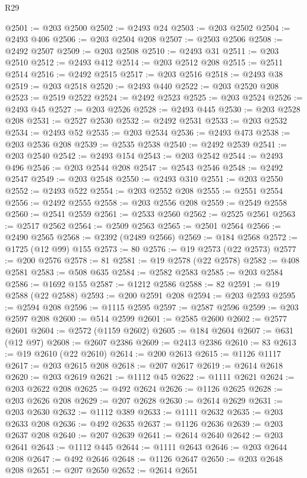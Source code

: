 \begin{lexlean}{R29}
\begin{coremodule}
@2501 := @203 @2500
@2502 := @2493 @24
@2503 := @203 @2502
@2504 := @2493 @406
@2506 := @203 @2504 @208
@2507 := @2503 @2506
@2508 := @2492 @2507
@2509 := @203 @2508
@2510 := @2493 @31
@2511 := @203 @2510
@2512 := @2493 @412
@2514 := @203 @2512 @208
@2515 := @2511 @2514
@2516 := @2492 @2515
@2517 := @203 @2516
@2518 := @2493 @38
@2519 := @203 @2518
@2520 := @2493 @440
@2522 := @203 @2520 @208
@2523 := @2519 @2522
@2524 := @2492 @2523
@2525 := @203 @2524
@2526 := @2493 @45
@2527 := @203 @2526
@2528 := @2493 @445
@2530 := @203 @2528 @208
@2531 := @2527 @2530
@2532 := @2492 @2531
@2533 := @203 @2532
@2534 := @2493 @52
@2535 := @203 @2534
@2536 := @2493 @473
@2538 := @203 @2536 @208
@2539 := @2535 @2538
@2540 := @2492 @2539
@2541 := @203 @2540
@2542 := @2493 @154
@2543 := @203 @2542
@2544 := @2493 @496
@2546 := @203 @2544 @208
@2547 := @2543 @2546
@2548 := @2492 @2547
@2549 := @203 @2548
@2550 := @2493 @310
@2551 := @203 @2550
@2552 := @2493 @522
@2554 := @203 @2552 @208
@2555 := @2551 @2554
@2556 := @2492 @2555
@2558 := @203 @2556 @208
@2559 := @2549 @2558
@2560 := @2541 @2559
@2561 := @2533 @2560
@2562 := @2525 @2561
@2563 := @2517 @2562
@2564 := @2509 @2563
@2565 := @2501 @2564
@2566 := @2490 @2565
@2568 := @2392 (@2489 @2566)
@2569 := @184 @2568
@2572 := @1725 (@12 @99) @155
@2573 := 80
@2576 := @19 @2573 (@22 @2573)
@2577 := @200 @2576
@2578 := 81
@2581 := @19 @2578 (@22 @2578)
@2582 := @408 @2581
@2583 := @508 @635
@2584 := @2582 @2583
@2585 := @203 @2584
@2586 := @1692 @155
@2587 := @1212 @2586
@2588 := 82
@2591 := @19 @2588 (@22 @2588)
@2593 := @200 @2591 @208
@2594 := @203 @2593
@2595 := @2594 @208
@2596 := @1115 @2595
@2597 := @2587 @2596
@2599 := @203 @2597 @208
@2600 := @514 @2599
@2601 := @2585 @2600
@2602 := @2577 @2601
@2604 := @2572 (@1159 @2602)
@2605 := @184 @2604
@2607 := @631 (@12 @97)
@2608 := @2607 @2386
@2609 := @2413 @2386
@2610 := 83
@2613 := @19 @2610 (@22 @2610)
@2614 := @200 @2613
@2615 := @1126 @1117
@2617 := @203 @2615 @208
@2618 := @207 @2617
@2619 := @2614 @2618
@2620 := @203 @2619
@2621 := @1112 @45
@2622 := @1111 @2621
@2624 := @203 @2622 @208
@2625 := @492 @2624
@2626 := @1126 @2625
@2628 := @203 @2626 @208
@2629 := @207 @2628
@2630 := @2614 @2629
@2631 := @203 @2630
@2632 := @1112 @389
@2633 := @1111 @2632
@2635 := @203 @2633 @208
@2636 := @492 @2635
@2637 := @1126 @2636
@2639 := @203 @2637 @208
@2640 := @207 @2639
@2641 := @2614 @2640
@2642 := @203 @2641
@2643 := @1112 @445
@2644 := @1111 @2643
@2646 := @203 @2644 @208
@2647 := @492 @2646
@2648 := @1126 @2647
@2650 := @203 @2648 @208
@2651 := @207 @2650
@2652 := @2614 @2651

\end{coremodule}
\end{lexlean}
